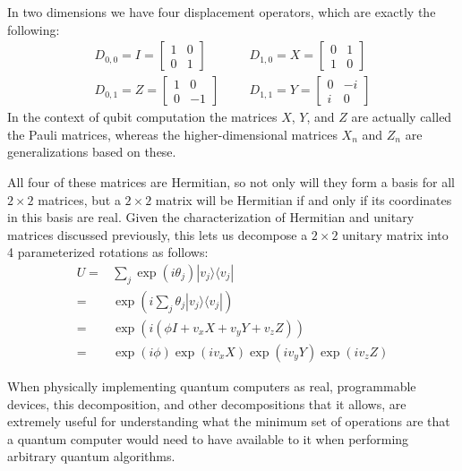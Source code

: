 \documentclass[]{article}
\newcommand{\bra}[1]{\langle #1 |}
\newcommand{\ket}[1]{| #1 \rangle}
\begin{document}
In two dimensions we have four displacement operators, which are exactly the following:
\begin{align*}
D_{0,0}=I=\left[\begin{matrix}
1&0\\
0&1
\end{matrix}\right]
&&&
D_{1,0}=X=\left[\begin{matrix}
0&1\\
1&0
\end{matrix}\right]
\\
D_{0,1}=Z=\left[\begin{matrix}
1&0\\
0&-1
\end{matrix}\right]
&&&
D_{1,1}=Y=\left[\begin{matrix}
0&-i\\
i&0
\end{matrix}\right]
\end{align*}
In the context of qubit computation the matrices $X$, $Y$, and $Z$ are actually called the Pauli matrices, whereas the higher-dimensional matrices $X_n$ and $Z_n$ are generalizations based on these.

All four of these matrices are Hermitian, so not only will they form a basis for all $2\times2$ matrices, but a $2\times2$ matrix will be Hermitian if and only if its coordinates in this basis are real. Given the characterization of Hermitian and unitary matrices discussed previously, this lets us decompose a $2\times2$ unitary matrix into 4 parameterized rotations as follows:
\begin{align*}
U
=& \sum_j \exp(i\theta_j)\ket{v_j}\bra{v_j}
\\=& \exp\left(i\sum_j \theta_j\ket{v_j}\bra{v_j}\right)
\\=& \exp\left(i(\phi I + v_xX+v_yY+v_zZ)\right)
\\=& \exp\left(i\phi\right)\exp(iv_xX)\exp(iv_yY)\exp(iv_zZ)
\end{align*}

When physically implementing quantum computers as real, programmable devices, this decomposition, and other decompositions that it allows, are extremely useful for understanding what the minimum set of operations are that a quantum computer would need to have available to it when performing arbitrary quantum algorithms.
\end{document}
